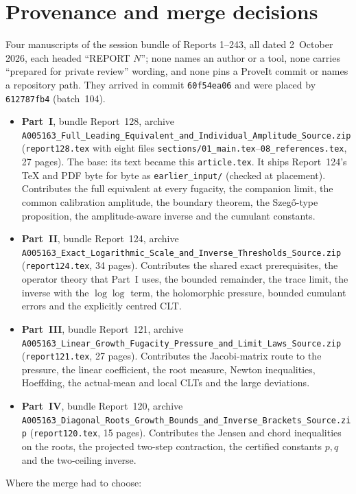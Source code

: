 \documentclass[11pt,letterpaper]{article}
\theoremstyle{remark}\newtheorem{remark}[theorem]{Remark}
\newcommand{\file}[1]{\nolinkurl{#1}}
\begin{document}
\section*{Provenance and merge decisions}\label{dsasm:sec:provenance}
Four manuscripts of the session bundle of Reports 1--243, all dated 2~October 2026, each headed ``REPORT $N$''; none names an author or a tool, none carries ``prepared for private review'' wording, and none pins a ProveIt commit or names a repository path. They arrived in commit \texttt{60f54ea06} and were placed by \texttt{612787fb4} (batch~104).
\begin{itemize}
\item \textbf{Part~I}, bundle Report~128, archive \file{A005163_Full_Leading_Equivalent_and_Individual_Amplitude_Source.zip} (\file{report128.tex} with eight files \file{sections/01_main.tex}--\file{08_references.tex}, 27 pages). The base: its text became this \file{article.tex}. It ships Report~124's TeX and PDF byte for byte as \file{earlier_input/} (checked at placement). Contributes the full equivalent at every fugacity, the companion limit, the common calibration amplitude, the boundary theorem, the Szeg\H{o}-type proposition, the amplitude-aware inverse and the cumulant constants.
\item \textbf{Part~II}, bundle Report~124, archive \file{A005163_Exact_Logarithmic_Scale_and_Inverse_Thresholds_Source.zip} (\file{report124.tex}, 34 pages). Contributes the shared exact prerequisites, the operator theory that Part~I uses, the bounded remainder, the trace limit, the inverse with the $\log\log$ term, the holomorphic pressure, bounded cumulant errors and the explicitly centred CLT.
\item \textbf{Part~III}, bundle Report~121, archive \file{A005163_Linear_Growth_Fugacity_Pressure_and_Limit_Laws_Source.zip} (\file{report121.tex}, 27 pages). Contributes the Jacobi-matrix route to the pressure, the linear coefficient, the root measure, Newton inequalities, Hoeffding, the actual-mean and local CLTs and the large deviations.
\item \textbf{Part~IV}, bundle Report~120, archive \file{A005163_Diagonal_Roots_Growth_Bounds_and_Inverse_Brackets_Source.zip} (\file{report120.tex}, 15 pages). Contributes the Jensen and chord inequalities on the roots, the projected two-step contraction, the certified constants $p,q$ and the two-ceiling inverse.
\end{itemize}
Where the merge had to choose:
\end{document}
